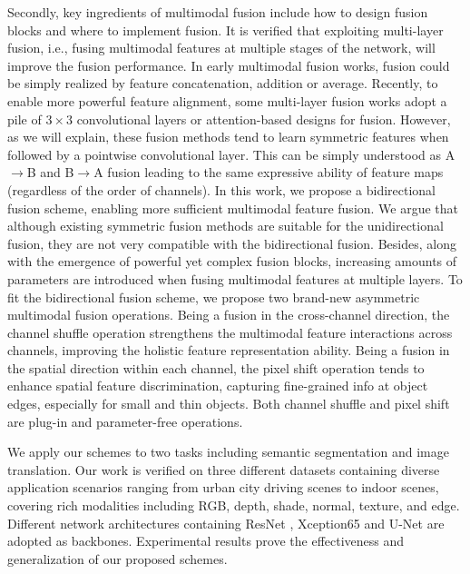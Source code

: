 \documentclass[sigconf]{acmart}
\begin{document}
Secondly, key ingredients of multimodal fusion include how to design fusion blocks and where to implement fusion. It is verified that exploiting multi-layer fusion, i.e., fusing multimodal features at multiple stages of the network, will improve the fusion performance. In early multimodal fusion works, fusion could be simply realized by feature concatenation, addition or average.  Recently, to enable more powerful feature alignment, some multi-layer fusion works adopt a pile of $3\times3$ convolutional layers \cite{DBLP:conf/iccv/LeePH17} or attention-based designs \cite{DBLP:journals/ijcv/RussakovskyDSKS15} for fusion. 
However, as we will explain, these fusion methods tend to learn symmetric features when followed by a pointwise convolutional layer. This can be simply understood as A$\to$B and B$\to$A fusion leading to the same expressive ability of feature maps (regardless of the order of channels). In this work, we propose a bidirectional fusion scheme, enabling more sufficient multimodal feature fusion. We argue that although existing symmetric fusion methods are suitable for the unidirectional fusion, they are not very compatible with the bidirectional fusion. Besides, along with the emergence of powerful yet complex fusion blocks, increasing amounts of parameters are introduced when fusing multimodal features at multiple layers. To fit the bidirectional fusion scheme, we propose two brand-new asymmetric multimodal fusion operations. Being a fusion in the cross-channel direction, the channel shuffle operation strengthens the multimodal feature interactions across channels, improving the holistic feature representation ability. Being a fusion in the spatial direction within each channel, the pixel shift operation tends to enhance spatial feature discrimination, capturing fine-grained info at object edges, especially for small and thin objects. Both channel shuffle and pixel shift are plug-in and parameter-free operations. 

We apply our schemes to two tasks including semantic segmentation and image translation. Our work is verified on three different datasets containing diverse application scenarios ranging from urban city driving scenes to indoor scenes, covering rich modalities  including RGB, depth, shade, normal, texture, and edge. Different network architectures containing ResNet \cite{DBLP:conf/cvpr/HeZRS16}, Xception65 \cite{DBLP:conf/cvpr/Chollet17} and U-Net \cite{DBLP:conf/miccai/RonnebergerFB15} are adopted as backbones.  Experimental results prove the effectiveness and generalization of our proposed schemes. 
\end{document}
